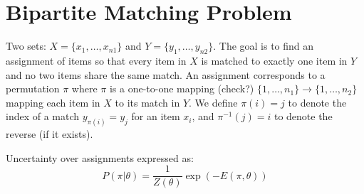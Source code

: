 \documentclass[11pt,reqno]{amsart}
\begin{document}
\section{Bipartite Matching Problem}
Two sets: $X = \{x_1, \dots, x_{n1}\}$ and $Y = \{y_1, \dots, y_{n2}\}$. The goal is to find an assignment of items so that every item in $X$ is matched to exactly one item in $Y$ and no two items share the same match.  An assignment corresponds to a permutation $\pi$ where $\pi$ is a one-to-one mapping (check?) $\{1, \dots, n_1\} \to \{1, \dots, n_2\}$ mapping each item in $X$ to its match in $Y$.  We define $\pi(i) = j$ to denote the index of a match $y_{\pi(i)} = y_j$ for an item $x_i$, and $\pi^{-1}(j) = i$ to denote the reverse (if it exists). 

Uncertainty over assignments expressed as:
\[ P(\pi | \theta)  = \frac{1}{Z(\theta)} \exp(-E(\pi,\theta))\]
\end{document}
